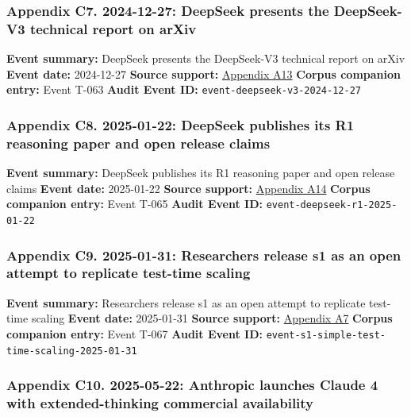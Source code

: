 \documentclass[
  american,
  11pt,
  letterpaper,
]{article}
\begin{document}
\subsubsection{Appendix C7. 2024-12-27: DeepSeek presents the
DeepSeek-V3 technical report on
arXiv}\label{ch-06-appendix-c7-2024-12-27-deepseek-presents-the-deepseek-v3-technical-report-on-arxiv}

\textbf{Event summary:} DeepSeek presents the DeepSeek-V3 technical
report on arXiv \textbf{Event date:} 2024-12-27 \textbf{Source support:}
\hyperref[ch-06-appendix-a13-deepseek-v3-technical-report]{Appendix A13}
\textbf{Corpus companion entry:} Event T-063 \textbf{Audit Event ID:}
\texttt{event-deepseek-v3-2024-12-27}

\subsubsection{Appendix C8. 2025-01-22: DeepSeek publishes its R1
reasoning paper and open release
claims}\label{ch-06-appendix-c8-2025-01-22-deepseek-publishes-its-r1-reasoning-paper-and-open-release-claims}

\textbf{Event summary:} DeepSeek publishes its R1 reasoning paper and
open release claims \textbf{Event date:} 2025-01-22 \textbf{Source
support:}
\hyperref[ch-06-appendix-a14-deepseek-r1-incentivizing-reasoning-capability-in-llms-via-reinforcement-learning]{Appendix
A14} \textbf{Corpus companion entry:} Event T-065 \textbf{Audit Event
ID:} \texttt{event-deepseek-r1-2025-01-22}

\subsubsection{Appendix C9. 2025-01-31: Researchers release s1 as an
open attempt to replicate test-time
scaling}\label{ch-06-appendix-c9-2025-01-31-researchers-release-s1-as-an-open-attempt-to-replicate-test-time-scaling}

\textbf{Event summary:} Researchers release s1 as an open attempt to
replicate test-time scaling \textbf{Event date:} 2025-01-31
\textbf{Source support:}
\hyperref[ch-06-appendix-a7-s1-simple-test-time-scaling]{Appendix A7}
\textbf{Corpus companion entry:} Event T-067 \textbf{Audit Event ID:}
\texttt{event-s1-simple-test-time-scaling-2025-01-31}

\subsubsection{Appendix C10. 2025-05-22: Anthropic launches Claude 4
with extended-thinking commercial
availability}\label{ch-06-appendix-c10-2025-05-22-anthropic-launches-claude-4-with-extended-thinking-commercial-availability}
\end{document}
